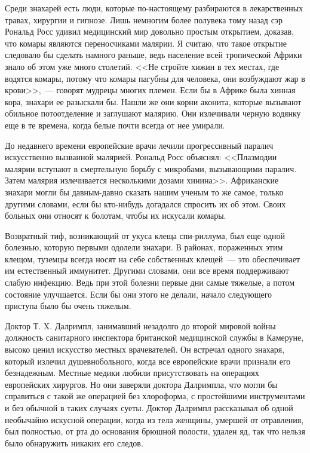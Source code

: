 \documentclass[12pt,a4paper,twoside,openany,svgnames]{memoir}
\begin{document}
Среди знахарей есть люди, которые по-настоящему разбираются в лекарственных травах, хирургии и гипнозе. Лишь немногим более полувека тому назад сэр Рональд Росс удивил медицинский мир довольно простым открытием, доказав, что комары являются переносчиками малярии. Я считаю, что такое открытие следовало бы сделать намного раньше, ведь население всей тропической Африки знало об этом уже много столетий. <<Не стройте хижин в тех местах, где водятся комары, потому что комары пагубны для человека, они возбуждают жар в крови>>,~--- говорят мудрецы многих племен. Если бы в Африке была хинная кора, знахари ее разыскали бы. Нашли же они корни аконита, которые вызывают обильное потоотделение и заглушают малярию. Они излечивали черную водянку еще в те времена, когда белые почти всегда от нее умирали.

До недавнего времени европейские врачи лечили прогрессивный паралич искусственно вызванной малярией. Рональд Росс объяснял: <<Плазмодии малярии вступают в смертельную борьбу с микробами, вызывающими паралич. Затем малярия излечивается несколькими дозами хинина>>. Африканские знахари могли бы давным-давно сказать нашим ученым то же самое, только другими словами, если бы кто-нибудь догадался спросить их об этом. Своих больных они относят к болотам, чтобы их искусали комары.

Возвратный тиф, возникающий от укуса клеща спи-риллума, был еще одной болезнью, которую первыми одолели знахари. В районах, пораженных этим клещом, туземцы всегда носят на себе собственных клещей~--- это обеспечивает им естественный иммунитет. Другими словами, они все время поддерживают слабую инфекцию. Ведь при этой болезни первые дни самые тяжелые, а потом состояние улучшается. Если бы они этого не делали, начало следующего приступа было бы очень тяжелым.

Доктор Т. X. Далримпл, занимавший незадолго до второй мировой войны должность санитарного инспектора британской медицинской службы в Камеруне, высоко ценил искусство местных врачевателей. Он встречал одного знахаря, который излечил душевнобольного, когда все европейские врачи признали его безнадежным. Местные медики любили присутствовать на операциях европейских хирургов. Но они заверяли доктора Далримпла, что могли бы справиться с такой же операцией без хлороформа, с простейшими инструментами и без обычной в таких случаях суеты. Доктор Далримпл рассказывал об одной необычайно искусной операции, когда из тела женщины, умершей от отравления, был полностью, от рта до основания брюшной полости, удален яд, так что нельзя было обнаружить никаких его следов.
\end{document}
